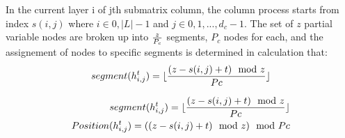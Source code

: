 In the current layer i of jth submatrix column, the column process starts from index $s(i, j)$ where $i \in {0, |L|-1}$ and $j \in {0, 1, ..., d_{c}-1}$. The set of $z$ partial variable nodes are broken up into $z \over P_{c}$ segments, $P_{c}$ nodes for each, and the assignement of nodes to specific segments is determined in calculation that:
\begin{align}
	segment(h^{t}_{i,j}) = \lfloor {{( z - s(i, j) + t ) \mod z}  \over Pc} \rfloor
\end{align}

\begin{align}
	segment(h^{t}_{i,j}) = \lfloor {{( z - s(i, j) + t ) \mod z}  \over Pc} \rfloor 
	\\
	Position(h^{t}_{i,j}) =({( z - s(i, j) + t ) \mod z})  \mod Pc
\end{align}